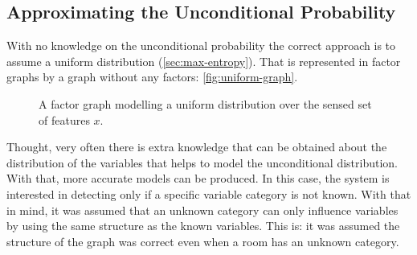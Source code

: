 \subsection{Approximating the Unconditional Probability}

With no knowledge on the unconditional probability the correct approach is to
assume a uniform distribution (\autoref{sec:max-entropy}).
That is represented in factor graphs by a graph without any factors: \autoref{fig:uniform-graph}.

\begin{figure}[h]
\centering
{}
\caption{\label{fig:uniform-graph}A factor graph modelling a uniform
         distribution over the sensed set of features $x$.}
\end{figure}

Thought, very often there is extra knowledge that can be obtained about the distribution
of the variables that helps to model the unconditional distribution. With that, more accurate
models can be produced.
In this case, the system is interested in detecting only if a specific variable category is not
known. With that in mind, it was assumed that an unknown category can only influence variables
by using the same structure as the known variables. This is: it was assumed the structure of the
graph was correct even when a room has an unknown category.

